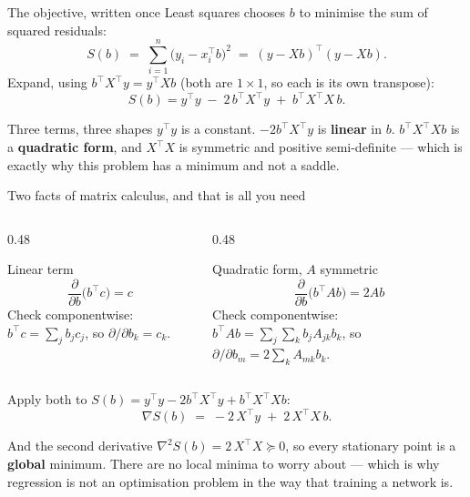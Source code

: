 \documentclass[aspectratio=169]{beamer}
\newcommand{\Xt}{X^{\!\top}}
\begin{document}
\begin{frame}[shrink=6]{The objective, written once}
  Least squares chooses $b$ to minimise the sum of squared residuals:
  \[
    S(b) \;=\; \sum_{i=1}^{n}\bigl(y_i - x_i^{\!\top} b\bigr)^2
         \;=\; (y - Xb)^{\!\top}(y - Xb).
  \]
  Expand, using $b^{\!\top}\Xt y = y^{\!\top} X b$ (both are $1\times1$, so
  each is its own transpose):
  \begin{equation*}
    S(b) = y^{\!\top}y \;-\; 2\,b^{\!\top}\Xt y \;+\; b^{\!\top}\Xt X\,b .
  \end{equation*}
  \begin{block}{Three terms, three shapes}
    \small $y^{\!\top}y$ is a constant. $-2b^{\!\top}\Xt y$ is
    \textbf{linear} in $b$. $b^{\!\top}\Xt X b$ is a \textbf{quadratic form},
    and $\Xt X$ is symmetric and positive semi-definite --- which is exactly
    why this problem has a minimum and not a saddle.
  \end{block}
\end{frame}

\begin{frame}[shrink=6]{Two facts of matrix calculus, and that is all you need}
  \begin{columns}[T]
    \begin{column}{0.48\textwidth}
      \begin{block}{Linear term}
        \[ \frac{\partial}{\partial b}\bigl(b^{\!\top}c\bigr) = c \]
        \small Check componentwise: $b^{\!\top}c = \sum_j b_j c_j$, so
        $\partial/\partial b_k = c_k$.
      \end{block}
    \end{column}
    \begin{column}{0.48\textwidth}
      \begin{block}{Quadratic form, $A$ symmetric}
        \[ \frac{\partial}{\partial b}\bigl(b^{\!\top}Ab\bigr) = 2Ab \]
        \small Check componentwise:
        $b^{\!\top}Ab = \sum_j\sum_k b_j A_{jk} b_k$, so
        $\partial/\partial b_m = 2\sum_k A_{mk}b_k$.
      \end{block}
    \end{column}
  \end{columns}
  \vspace{0.3em}
  Apply both to $S(b) = y^{\!\top}y - 2b^{\!\top}\Xt y + b^{\!\top}\Xt X b$:
  \[
    \nabla S(b) \;=\; -2\,\Xt y \;+\; 2\,\Xt X\,b .
  \]
  \begin{alertblock}{And the second derivative}
    \small $\nabla^2 S(b) = 2\,\Xt X \succeq 0$, so every stationary point is
    a \textbf{global} minimum. There are no local minima to worry about ---
    which is why regression is not an optimisation problem in the way that
    training a network is.
  \end{alertblock}
\end{frame}
\end{document}
